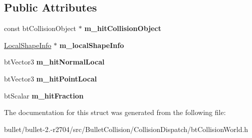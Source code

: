 \subsection*{Public Attributes}
\begin{DoxyCompactItemize}
\item 
\hypertarget{structbt_collision_world_1_1_local_convex_result_a8e29f360610ee96a79f438f0c114ad1b}{const bt\+Collision\+Object $\ast$ {\bfseries m\+\_\+hit\+Collision\+Object}}\label{structbt_collision_world_1_1_local_convex_result_a8e29f360610ee96a79f438f0c114ad1b}

\item 
\hypertarget{structbt_collision_world_1_1_local_convex_result_a6f1ff9ef4a440b5a09acbb2e40d7facd}{\hyperlink{structbt_collision_world_1_1_local_shape_info}{Local\+Shape\+Info} $\ast$ {\bfseries m\+\_\+local\+Shape\+Info}}\label{structbt_collision_world_1_1_local_convex_result_a6f1ff9ef4a440b5a09acbb2e40d7facd}

\item 
\hypertarget{structbt_collision_world_1_1_local_convex_result_a7f5d5d5c89c8399eac913f94c6ee99ca}{bt\+Vector3 {\bfseries m\+\_\+hit\+Normal\+Local}}\label{structbt_collision_world_1_1_local_convex_result_a7f5d5d5c89c8399eac913f94c6ee99ca}

\item 
\hypertarget{structbt_collision_world_1_1_local_convex_result_a1b1d40bf67c8906599a8e99ed2b7b89f}{bt\+Vector3 {\bfseries m\+\_\+hit\+Point\+Local}}\label{structbt_collision_world_1_1_local_convex_result_a1b1d40bf67c8906599a8e99ed2b7b89f}

\item 
\hypertarget{structbt_collision_world_1_1_local_convex_result_aa7a616613c1260e3e51c0482da3015e6}{bt\+Scalar {\bfseries m\+\_\+hit\+Fraction}}\label{structbt_collision_world_1_1_local_convex_result_aa7a616613c1260e3e51c0482da3015e6}

\end{DoxyCompactItemize}


The documentation for this struct was generated from the following file\+:\begin{DoxyCompactItemize}
\item 
bullet/bullet-\/2.-\/r2704/src/\+Bullet\+Collision/\+Collision\+Dispatch/bt\+Collision\+World.\+h\end{DoxyCompactItemize}
